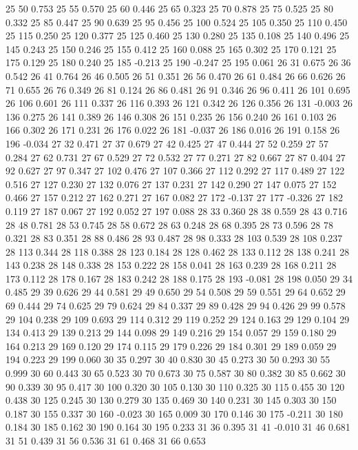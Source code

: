 25 50 0.753
25 55 0.570
25 60 0.446
25 65 0.323
25 70 0.878
25 75 0.525
25 80 0.332
25 85 0.447
25 90 0.639
25 95 0.456
25 100 0.524
25 105 0.350
25 110 0.450
25 115 0.250
25 120 0.377
25 125 0.460
25 130 0.280
25 135 0.108
25 140 0.496
25 145 0.243
25 150 0.246
25 155 0.412
25 160 0.088
25 165 0.302
25 170 0.121
25 175 0.129
25 180 0.240
25 185 -0.213
25 190 -0.247
25 195 0.061
26 31 0.675
26 36 0.542
26 41 0.764
26 46 0.505
26 51 0.351
26 56 0.470
26 61 0.484
26 66 0.626
26 71 0.655
26 76 0.349
26 81 0.124
26 86 0.481
26 91 0.346
26 96 0.411
26 101 0.695
26 106 0.601
26 111 0.337
26 116 0.393
26 121 0.342
26 126 0.356
26 131 -0.003
26 136 0.275
26 141 0.389
26 146 0.308
26 151 0.235
26 156 0.240
26 161 0.103
26 166 0.302
26 171 0.231
26 176 0.022
26 181 -0.037
26 186 0.016
26 191 0.158
26 196 -0.034
27 32 0.471
27 37 0.679
27 42 0.425
27 47 0.444
27 52 0.259
27 57 0.284
27 62 0.731
27 67 0.529
27 72 0.532
27 77 0.271
27 82 0.667
27 87 0.404
27 92 0.627
27 97 0.347
27 102 0.476
27 107 0.366
27 112 0.292
27 117 0.489
27 122 0.516
27 127 0.230
27 132 0.076
27 137 0.231
27 142 0.290
27 147 0.075
27 152 0.466
27 157 0.212
27 162 0.271
27 167 0.082
27 172 -0.137
27 177 -0.326
27 182 0.119
27 187 0.067
27 192 0.052
27 197 0.088
28 33 0.360
28 38 0.559
28 43 0.716
28 48 0.781
28 53 0.745
28 58 0.672
28 63 0.248
28 68 0.395
28 73 0.596
28 78 0.321
28 83 0.351
28 88 0.486
28 93 0.487
28 98 0.333
28 103 0.539
28 108 0.237
28 113 0.344
28 118 0.388
28 123 0.184
28 128 0.462
28 133 0.112
28 138 0.241
28 143 0.238
28 148 0.338
28 153 0.222
28 158 0.041
28 163 0.239
28 168 0.211
28 173 0.112
28 178 0.167
28 183 0.242
28 188 0.175
28 193 -0.081
28 198 0.050
29 34 0.485
29 39 0.626
29 44 0.581
29 49 0.650
29 54 0.508
29 59 0.551
29 64 0.652
29 69 0.444
29 74 0.625
29 79 0.624
29 84 0.337
29 89 0.428
29 94 0.426
29 99 0.578
29 104 0.238
29 109 0.693
29 114 0.312
29 119 0.252
29 124 0.163
29 129 0.104
29 134 0.413
29 139 0.213
29 144 0.098
29 149 0.216
29 154 0.057
29 159 0.180
29 164 0.213
29 169 0.120
29 174 0.115
29 179 0.226
29 184 0.301
29 189 0.059
29 194 0.223
29 199 0.060
30 35 0.297
30 40 0.830
30 45 0.273
30 50 0.293
30 55 0.999
30 60 0.443
30 65 0.523
30 70 0.673
30 75 0.587
30 80 0.382
30 85 0.662
30 90 0.339
30 95 0.417
30 100 0.320
30 105 0.130
30 110 0.325
30 115 0.455
30 120 0.438
30 125 0.245
30 130 0.279
30 135 0.469
30 140 0.231
30 145 0.303
30 150 0.187
30 155 0.337
30 160 -0.023
30 165 0.009
30 170 0.146
30 175 -0.211
30 180 0.184
30 185 0.162
30 190 0.164
30 195 0.233
31 36 0.395
31 41 -0.010
31 46 0.681
31 51 0.439
31 56 0.536
31 61 0.468
31 66 0.653
